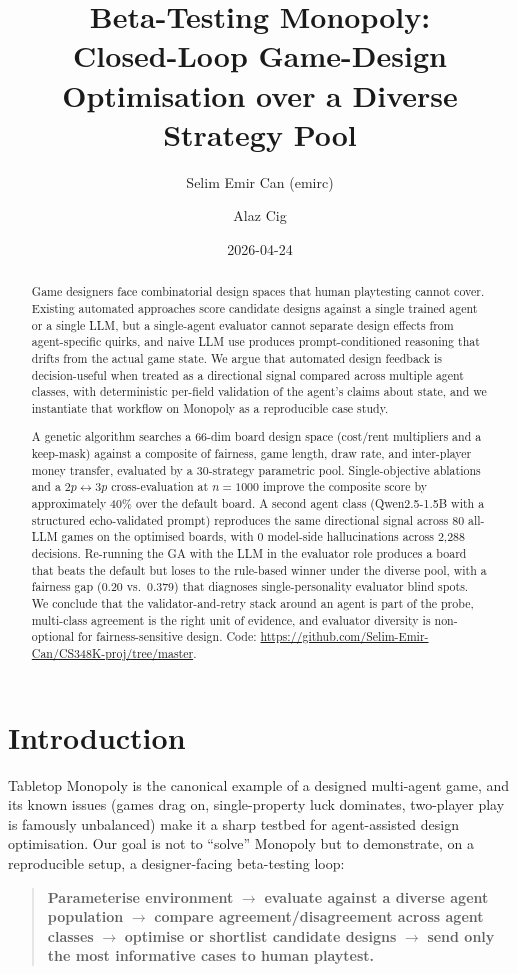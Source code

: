 \documentclass[10pt]{article}
\title{Beta-Testing Monopoly: \\Closed-Loop Game-Design Optimisation
       over a Diverse Strategy Pool}
\author{Selim Emir Can (emirc) \and Alaz Cig}
\date{2026-04-24}
\begin{document}
\maketitle

\begin{abstract}
Game designers face combinatorial design spaces that human
playtesting cannot cover. Existing automated approaches score
candidate designs against a single trained agent or a single LLM,
but a single-agent evaluator cannot separate design effects from
agent-specific quirks, and naive LLM use produces prompt-conditioned
reasoning that drifts from the actual game state. We argue that
automated design feedback is decision-useful when treated as a
directional signal compared across multiple agent classes, with
deterministic per-field validation of the agent's claims about
state, and we instantiate that workflow on Monopoly as a
reproducible case study.

A genetic algorithm searches a 66-dim board design space (cost/rent
multipliers and a keep-mask) against a composite of fairness, game
length, draw rate, and inter-player money transfer, evaluated by a
30-strategy parametric pool. Single-objective ablations and a
$2p\!\leftrightarrow\!3p$ cross-evaluation at $n{=}1000$ improve the
composite score by approximately 40\% over the default board. A
second agent class (Qwen2.5-1.5B with a structured echo-validated
prompt) reproduces the same directional signal across 80 all-LLM
games on the optimised boards, with 0 model-side hallucinations
across 2{,}288 decisions. Re-running the GA with the LLM in the
evaluator role produces a board that beats the default but loses to
the rule-based winner under the diverse pool, with a fairness gap
(0.20 vs.\ 0.379) that diagnoses single-personality evaluator blind
spots. We conclude that the validator-and-retry stack around an
agent is part of the probe, multi-class agreement is the right unit
of evidence, and evaluator diversity is non-optional for
fairness-sensitive design.
Code: \url{https://github.com/Selim-Emir-Can/CS348K-proj/tree/master}.
\end{abstract}

\section{Introduction}

Tabletop Monopoly is the canonical example of a designed multi-agent game,
and its known issues (games drag on, single-property luck dominates,
two-player play is famously unbalanced) make it a sharp testbed for
agent-assisted design optimisation. Our goal is not to ``solve'' Monopoly
but to demonstrate, on a reproducible setup, a designer-facing
beta-testing loop:
\begin{quote}
\textbf{Parameterise environment} $\to$ \textbf{evaluate against a diverse
agent population} $\to$ \textbf{compare agreement/disagreement across
agent classes} $\to$ \textbf{optimise or shortlist candidate designs}
$\to$ \textbf{send only the most informative cases to human playtest.}
\end{quote}
\end{document}
